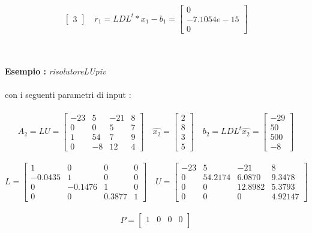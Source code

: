 \begin{description}
\[\begin{bmatrix}
			3                
		\end{bmatrix} \quad
		r_1 = LDL^t*x_1-b_1 =\begin{bmatrix}
			0 \\
		  	-7.1054e-15 \\
		  	0
		\end{bmatrix}
		\]\\\\
\item \textbf{Esempio :} \textit{risolutoreLUpiv}\\\\	
	con i seguenti parametri di input :\\\	  
		\[
		A_2 = LU =\begin{bmatrix}
			-23 & 5  & -21 & 8 \\ 
			0 	& 0  & 5   & 7 \\
			1 	& 54 & 7   & 9 \\
			0 	& -8 & 12  & 4  
		\end{bmatrix} \quad
		\hat{x_2} =\begin{bmatrix}
			2 \\
			8 \\
			3 \\
			5               
		\end{bmatrix} \quad
		b_2 = LDL^t \hat{x_2} =\begin{bmatrix}
			-29 \\
			50  \\
			500 \\
			-8                
		\end{bmatrix}
		\]\\
		\[
		L =\begin{bmatrix}
			1   	&  0  		& 0 	 & 0 \\ 
			-0.0435 &  1  		& 0 	 & 0 \\
		 	0   	&  -0.1476  & 1 	 & 0 \\
		 	0   	&  0  		& 0.3877 & 1 		    
		\end{bmatrix} \quad
		U =\begin{bmatrix}
			-23 & 5 	  & -21		& 8   	   \\ 
			0 	& 54.2174 & 6.0870 	& 9.3478   \\ 
			0 	& 0 	  & 12.8982 & 5.3793   \\ 
			0 	& 0 	  & 0 		& 4.92147		
		\end{bmatrix}
		\]\\ 
		\[
		P =\begin{bmatrix}
			1 & 0 & 0 & 0 \\ 

\end{bmatrix}\]
\end{description}
